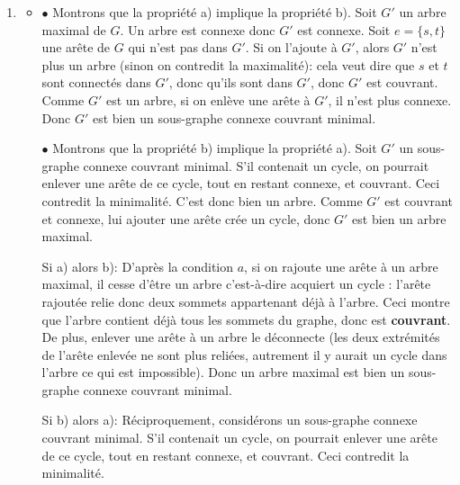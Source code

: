\begin{Soln}{84}
\begin{enumerate}
\item
\begin{itemize}
\item $\bullet$ Montrons que la propriété a) implique la propriété b). Soit $G'$ un arbre maximal de $G$. Un arbre est connexe donc $G'$ est connexe. Soit $e=\{s,t\}$ une arête de $G$ qui n'est pas dans $G'$. Si on l'ajoute à $G'$, alors $G'$ n'est plus un arbre (sinon on contredit la maximalité): cela veut dire que $s$ et $t$ sont connectés dans $G'$,  donc qu'ils sont dans $G'$, donc $G'$ est couvrant. Comme $G'$ est un arbre, si on enlève une arête à $G'$, il n'est plus connexe. Donc $G'$ est bien un sous-graphe connexe couvrant minimal.

$\bullet$ Montrons que la propriété b) implique la propriété a). Soit $G'$ un sous-graphe connexe couvrant minimal. S'il contenait un cycle, on pourrait enlever une arête de ce cycle, tout en restant connexe, et couvrant. Ceci contredit la minimalité. C'est donc bien un arbre. Comme $G'$ est couvrant et connexe, lui ajouter une arête crée un cycle, donc $G'$ est bien un arbre maximal.


\item[Si a) alors b): ] D'après la condition $a$, si on rajoute une arête à un arbre maximal, il cesse d'être un arbre c'est-à-dire acquiert un cycle : l'arête rajoutée relie donc deux sommets appartenant déjà à l'arbre. Ceci montre que l'arbre contient déjà tous les sommets du graphe, donc est \textbf{couvrant}. De plus, enlever une arête  à un arbre le déconnecte (les deux extrémités de l'arête enlevée ne sont plus reliées, autrement il y aurait un cycle dans l'arbre ce qui est impossible). Donc un arbre maximal est bien un sous-graphe connexe couvrant minimal.
\item[Si b) alors a): ] Réciproquement, considérons un sous-graphe connexe couvrant minimal. S'il contenait un cycle, on pourrait enlever une arête de ce cycle, tout en restant connexe, et couvrant. Ceci contredit la minimalité.
\end{itemize}


\end{enumerate}
\end{Soln}
